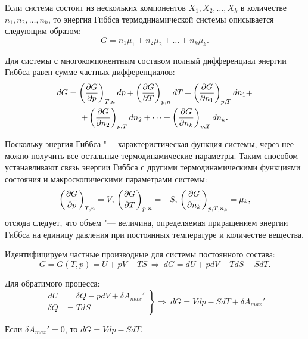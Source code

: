 \documentclass[12pt,a4paper,oneside]{book}
\begin{document}
Если система состоит из нескольких компонентов $X_1, X_2, \dots, X_k$ в количестве $n_1, n_2, \dots, n_k$, то энергия Гиббса термодинамической системы описывается следующим образом:
\begin{equation}
	G = n_1 \mu_1+n_2 \mu_2 + \dots +n_k \mu_k.
\end{equation}

Для системы с многокомпонентным составом полный дифференциал энергии Гиббса равен сумме частных дифференциалов:
\begin{gather}
	dG = \left( \frac{\partial G}{\partial p} \right)_{T, n}dp+\left( \frac{\partial G}{\partial T} \right)_{p, n}dT+\left( \frac{\partial G}{\partial n_1} \right)_{p, T}dn_1+ \notag \\
+ \left( \frac{\partial G}{\partial n_2} \right)_{p, T}dn_2+ \dots +\left( \frac{\partial G}{\partial n_k} \right)_{p, T}dn_k. \notag
\end{gather}

Поскольку энергия Гиббса "--- характеристическая функция системы, через нее можно получить все остальные термодинамические параметры. Таким способом устанавливают связь энергии Гиббса с другими термодинамическими функциями состояния и макроскопическими параметрами системы:
\begin{equation}
\left( \frac{\partial G}{\partial p} \right)_{T, n} = V, \\
\left( \frac{\partial G}{\partial T} \right)_{p, n} = -S, \\
\left( \frac{\partial G}{\partial n_k} \right)_{p, T, n_k}= \mu_k,
\end{equation}
отсюда следует, что объем "--- величина, определяемая приращением энергии Гиббса на единицу давления при постоянных температуре и количестве вещества.

Идентифицируем частные производные для системы постоянного состава:
\begin{equation}
	G = G(T, p) = U + pV - TS \ \Rightarrow \ dG = dU + pdV - TdS - SdT.
\end{equation}

Для обратимого процесса:
\begin{equation}
\left.
	\begin{aligned}
	dU & =\delta Q-pdV+\delta A_{max}'\\
	\delta Q & =TdS
	\end{aligned}
\right\}
	\Rightarrow\ dG=Vdp-SdT+ \delta A_{max}'  
\end{equation}

Если $\delta A_{max}'=0$, то $dG=Vdp-SdT$.
\end{document}
